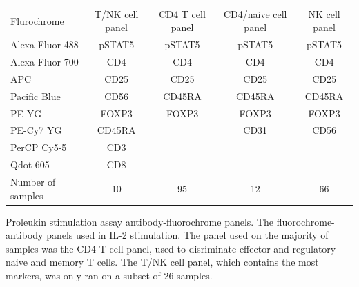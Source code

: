 \begin{table}[h!]\footnotesize
  \centering
\begin{tabularx}{\textwidth}{lcccc}
\rowcolor{Gray}
Flurochrome       & T/NK cell panel & CD4 T cell panel & CD4/naive cell panel & NK cell panel \\
Alexa Fluor 488   & pSTAT5          & pSTAT5           & pSTAT5               & pSTAT5  \\
Alexa Fluor 700   & CD4             & CD4              & CD4                  & CD4     \\
APC               & CD25            & CD25             & CD25                 & CD25    \\
Pacific Blue      & CD56            & CD45RA           & CD45RA               & CD45RA  \\
PE YG             & FOXP3           & FOXP3            & FOXP3                & FOXP3   \\
PE-Cy7 YG         & CD45RA          &                  & CD31                 & CD56    \\
PerCP Cy5-5       & CD3             &                  &                      & \\
Qdot 605          & CD8             &                  &                      & \\
\hline
Number of samples & 10              & 95               & 12                   & 66 \\
\end{tabularx}
{Proleukin stimulation assay antibody-fluorochrome panels.}
{
The fluorochrome-antibody panels used in IL-2 stimulation.
The panel used on the majority of samples was the CD4 T cell panel, used to disriminate
effector and regulatory naive and memory T cells.
The T/NK cell panel, which contains the most markers, was only ran on a subset of 26 samples.
}
\end{table}
%

